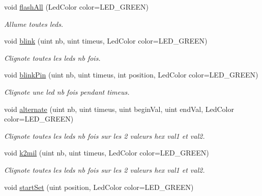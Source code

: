 \begin{DoxyCompactItemize}
void \hyperlink{classLedBar_ad91d62f821e6b1eb6689a0d23f021097}{flash\+All} (Led\+Color color=L\+E\+D\+\_\+\+G\+R\+E\+EN)
\begin{DoxyCompactList}\small\item\em Allume toutes leds. \end{DoxyCompactList}\item 
\mbox{\label{classLedBar_afad90556b784654b618c527eb19c50dd}} 
void \hyperlink{classLedBar_afad90556b784654b618c527eb19c50dd}{blink} (uint nb, uint timeus, Led\+Color color=L\+E\+D\+\_\+\+G\+R\+E\+EN)
\begin{DoxyCompactList}\small\item\em Clignote toutes les leds nb fois. \end{DoxyCompactList}\item 
\mbox{\label{classLedBar_abc84af9e1f24d8e7a0c9a7f67767c34f}} 
void \hyperlink{classLedBar_abc84af9e1f24d8e7a0c9a7f67767c34f}{blink\+Pin} (uint nb, uint timeus, int position, Led\+Color color=L\+E\+D\+\_\+\+G\+R\+E\+EN)
\begin{DoxyCompactList}\small\item\em Clignote une led nb fois pendant timeus. \end{DoxyCompactList}\item 
\mbox{\label{classLedBar_ab34bee22db4d68f6c6057e2fbb3b33cd}} 
void \hyperlink{classLedBar_ab34bee22db4d68f6c6057e2fbb3b33cd}{alternate} (uint nb, uint timeus, uint begin\+Val, uint end\+Val, Led\+Color color=L\+E\+D\+\_\+\+G\+R\+E\+EN)
\begin{DoxyCompactList}\small\item\em Clignote toutes les leds nb fois sur les 2 valeurs hex val1 et val2. \end{DoxyCompactList}\item 
\mbox{\label{classLedBar_a5272d702b081c2fe6288a690e92cc488}} 
void \hyperlink{classLedBar_a5272d702b081c2fe6288a690e92cc488}{k2mil} (uint nb, uint timeus, Led\+Color color=L\+E\+D\+\_\+\+G\+R\+E\+EN)
\begin{DoxyCompactList}\small\item\em Clignote toutes les leds nb fois sur les 2 valeurs hex val1 et val2. \end{DoxyCompactList}\item 
void \hyperlink{classLedBar_a985018b17b5051935a30d19e32880e11}{start\+Set} (uint position, Led\+Color color=L\+E\+D\+\_\+\+G\+R\+E\+EN)

\end{DoxyCompactItemize}
